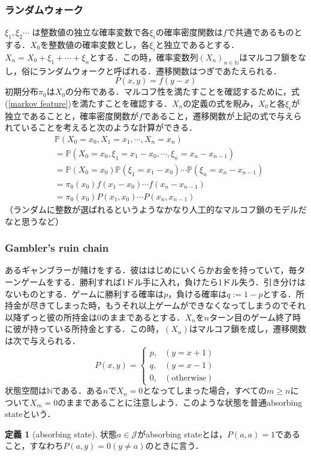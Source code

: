\documentclass[12pt, a4paper]{jsarticle}
\theoremstyle{definition}
\newtheorem{defn}{定義}[section]
\newcommand{\NN}{{\mathbb{N}}} %
\begin{document}
\subsubsection{ランダムウォーク}
$\xi_1,\xi_2 \cdots$ は整数値の独立な確率変数で各$\xi_i$の確率密度関数は$f$で共通であるものとする．$X_0$を整数値の確率変数とし，各$\xi_i$と独立であるとする．$X_n = X_0 + \xi_1 + \cdots + \xi_n$とする．この時，確率変数列$(X_n)_{n \in \NN}$はマルコフ鎖をなし，俗にランダムウォークと呼ばれる．遷移関数はつぎであたえられる．
\[P(x,y) = f(y-x)\]
初期分布$\pi_0$は$X_0$の分布である．マルコフ性を満たすことを確認するために，式(\ref{markov feature})を満たすことを確認する．$X_n$の定義の式を睨み，$X_0$と各$\xi_i$が独立であることと，確率密度関数が$f$であること，遷移関数が上記の式で与えられていることを考えると次のような計算ができる．
\begin{align*}
&\mathbb{P}(X_0 = x_0,X_1 = x_1 ,\cdots ,X_n = x_n) \\
&= \mathbb{P}(X_0 = x_0,\xi_1 = x_1 - x_0, \cdots , \xi_n = x_n - x_{n-1}) \\
&= \mathbb{P}(X_0 = x_0)\mathbb{P}(\xi_1 = x_1 - x_0)\cdots \mathbb{P}(\xi_n = x_n - x_{n-1}) \\
&= \pi_0(x_0)f(x_1 - x_0)\cdots f(x_n - x_{n-1}) \\
&=\pi_0(x_0)P(x_1 , x_0)\cdots P(x_n , x_{n-1})
\end{align*}
（ランダムに整数が選ばれるというようなかなり人工的なマルコフ鎖のモデルだなと思うなど）

\subsubsection{Gambler's ruin chain}
あるギャンブラーが賭けをする．彼ははじめにいくらかお金を持っていて，毎ターンゲームをする．勝利すれば1ドル手に入れ，負けたら1ドル失う．引き分けはないものとする．ゲームに勝利する確率は$p$，負ける確率は$q:= 1-p$とする．所持金が尽きてしまった時，もうそれ以上ゲームができなくなってしまうのでそれ以降ずっと彼の所持金は0のままであるとする．$X_n$を$n$ターン目のゲーム終了時に彼が持っている所持金とする．この時，$(X_n)$はマルコフ鎖を成し，遷移関数は次で与えられる．
\begin{equation}
	P(x,y) = 
	\begin{cases}
		p, & (y = x + 1) \\
		q, & (y = x - 1) \\
		0, & (\text{otherwise})
	\end{cases}
\end{equation}
状態空間は$\NN$である．ある$n$で$X_n = 0$となってしまった場合，すべての$m \ge n$について$X_m = 0$のままであることに注意しよう．このような状態を普通absorbing stateという．
\begin{screen}
	\begin{defn}[absorbing state]
	状態$a \in \mathcal{J}$がabsorbing stateとは，$P(a,a) = 1$であること，すなわち$P(a,y) = 0 (y \neq a)$のときに言う．
	\end{defn}
\end{screen}
\end{document}
